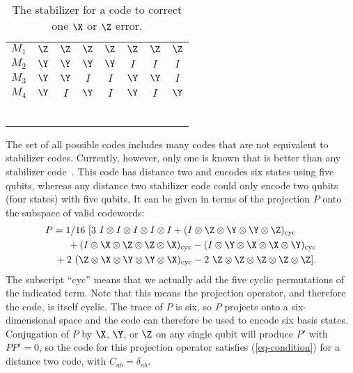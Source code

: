 \begin{table}
	\centering
	\begin{tabular}{c|ccccccc}
		$M_1$ & $\Z$ & $\Z$ & $\Z$ & $\Z$ & $\Z$ & $\Z$ & $\Z$ \\
		$M_2$ & $\Y$ & $\Y$ & $\Y$ & $\Y$ & $I$ & $I$ & $I$ \\
		$M_3$ & $\Y$ & $\Y$ & $I$ & $I$ & $\Y$ & $\Y$ & $I$ \\
		$M_4$ & $\Y$ & $I$ & $\Y$ & $I$ & $\Y$ & $I$ & $\Y$ \\
		\hline
		\low{$\Xbar_1$} & \low{$\X$} & \low{$\X$} & \low{$I$} & \low{$I$} & \low{$I$} &
		\low{$I$} & \low{$\Z$} \\
		\low{$\Xbar_2$} & \low{$\X$} & \low{$I$} & \low{$\X$} & \low{$I$} & \low{$I$} &
		\low{$\Z$} & \low{$I$} \\
		\low{$\Xbar_3$} & \low{$\X$} & \low{$I$} & \low{$I$} & \low{$\Z$} & \low{$\X$} &
		\low{$I$} & \low{$I$} \\
		\low{$\Zbar_1$} & \low{$I$} & \low{$\Z$} & \low{$I$} & \low{$\Z$} & \low{$I$} &
		\low{$\Z$} & \low{$I$} \\
		\low{$\Zbar_2$} & \low{$I$} & \low{$I$} & \low{$\Z$} & \low{$\Z$} & \low{$I$} &
		\low{$I$} & \low{$\Z$} \\
		\low{$\Zbar_3$} & \low{$I$} & \low{$I$} & \low{$I$} & \low{$I$} & \low{$\Z$} &
		\low{$\Z$} & \low{$\Z$}
	\end{tabular}
	\caption{The stabilizer for a code to correct one $\X$ or $\Z$ error.}
	\label{table-XZcode}
\end{table}

The set of all possible codes includes many codes that are not equivalent
to stabilizer codes.  Currently, however, only one is known that is better
than any stabilizer code~\cite{rains-nonstab}.  This code has distance two
and encodes six states using five qubits, whereas any distance two stabilizer
code could only encode two qubits (four states) with five qubits.  It can be
given in terms of the projection $P$ onto the subspace of valid codewords:
\begin{eqnarray}
	\lefteqn{P = 1/16\ [ 3\ I \otimes I \otimes I \otimes I \otimes I
	+ (I \otimes \Z \otimes \Y \otimes \Y \otimes \Z)_{\rm cyc}} \nonumber \\
	& & \mbox{} + (I \otimes \X \otimes \Z \otimes \Z \otimes \X)_{\rm cyc}
	- (I \otimes \Y \otimes \X \otimes \X \otimes \Y)_{\rm cyc} \\
	& & \mbox{} + 2\ (\Z \otimes \X \otimes \Y \otimes \Y \otimes \X)_{\rm cyc}
	- 2\ \Z \otimes \Z \otimes \Z \otimes \Z \otimes \Z ]. \nonumber
\end{eqnarray}
The subscript ``cyc'' means that we actually add the five cyclic permutations
of the indicated term.  Note that this means the projection operator, and
therefore the code, is itself cyclic.  The trace of $P$ is six, so $P$ projects
onto a six-dimensional space and the code can therefore be used to encode
six basis states.  Conjugation of $P$ by $\X$, $\Y$, or $\Z$ on any single
qubit will produce $P'$ with $P P' = 0$, so the code for this projection
operator satisfies (\ref{eq-condition}) for a distance two code, with $C_{ab} =
\delta_{ab}$.